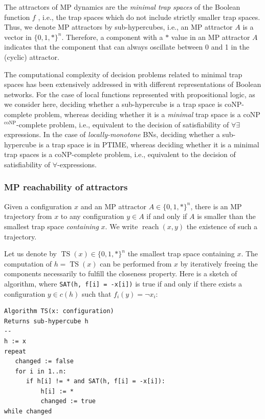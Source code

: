 \documentclass[PCJ,Unicode,screen,mode=plain]{cedram}
\begin{document}
The attractors of MP dynamics are the \emph{minimal trap spaces} of the
Boolean function \(f\) \citep{Pauleve2020}, i.e., the trap spaces which
do not include strictly smaller trap spaces. Thus, we denote MP
attractors by sub-hypercubes, i.e., an MP attractor \(A\) is a vector in
\(\{0,1,*\}^n\). Therefore, a component with a \(*\) value in an MP
attractor \(A\) indicates that the component that can always oscillate
between 0 and 1 in the (cyclic) attractor.

The computational complexity of decision problems related to minimal
trap spaces has been extensively addressed in
\citep{TrapSpaceComplexity} with different representations of Boolean
networks. For the case of local functions represented with propositional
logic, as we consider here, deciding whether a sub-hypercube is a trap
space is coNP-complete problem, whereas deciding whether it is a
\emph{minimal} trap space is a coNP\(^\text{coNP}\)-complete problem,
i.e., equivalent to the decision of satisfiability of \(\forall\exists\)
expressions. In the case of \emph{locally-monotone} BNs, deciding
whether a sub-hypercube is a trap space is in PTIME, whereas deciding
whether it is a minimal trap spaces is a coNP-complete problem, i.e.,
equivalent to the decision of satisfiability of \(\forall\)-expressions.

\hypertarget{mp-reachability-of-attractors}{%
\subsubsection{MP reachability of
attractors}\label{mp-reachability-of-attractors}}

Given a configuration \(x\) and an MP attractor \(A\in \{0,1,*\}^n\),
there is an MP trajectory from \(x\) to any configuration \(y\in A\) if
and only if \(A\) is smaller than the smallest trap space
\emph{containing} \(x\). We write \(\operatorname{reach}(x,y)\) the
existence of such a trajectory.

Let us denote by \(\operatorname{TS}(x) \in \{0,1,*\}^n\) the smallest
trap space containing \(x\). The computation of
\(h=\operatorname{TS}(x)\) can be performed from \(x\) by iteratively
freeing the components necessarily to fulfill the closeness property.
Here is a sketch of algorithm, where
\texttt{SAT(h,\ f{[}i{]}\ =\ -x{[}i{]})} is true if and only if there
exists a configuration \(y\in c(h)\) such that \(f_i(y)=\neg x_i\):

\begin{verbatim}
Algorithm TS(x: configuration)
Returns sub-hypercube h
--
h := x
repeat
   changed := false
   for i in 1..n:
      if h[i] != * and SAT(h, f[i] = -x[i]):
          h[i] := *
          changed := true
while changed
\end{verbatim}
\end{document}
